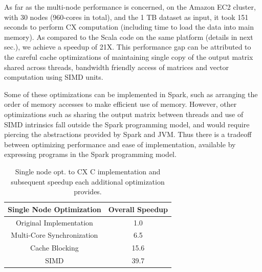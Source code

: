 


        As far as the multi-node performance is concerned, 
 on the Amazon EC2 cluster, with 30 nodes (960-cores in total), and
 the 1 TB dataset as input, it
 took 151 seconds to perform CX computation (including time to load
 the data into main memory). 
 As compared to the Scala code on the same platform (details in
 next sec.), we achieve a speedup of 21X.
%
 This performance gap can be attributed to the careful cache
 optimizations of maintaining single copy of the output matrix shared
 across threads, bandwidth friendly access of matrices and vector
 computation using SIMD units.

 Some of these optimizations can be implemented in Spark, such as arranging the
 order of memory accesses to make efficient use of memory. %
 However, other optimizations such as sharing the output matrix between threads
 and use of SIMD intrinsics fall outside the Spark programming model, and would
 require piercing the abstractions provided by Spark and JVM.
 Thus there is a tradeoff between optimizing performance 
 and ease of implementation, %
 available by expressing programs in the Spark programming model.

 
  \begin{table}
  \begin{center}
  \begin{tabular}{ |c|c| } 
  \hline
  Single Node Optimization & Overall Speedup\\
  \hline
  Original Implementation & 1.0  \\
  Multi-Core Synchronization & 6.5 \\
  Cache Blocking & 15.6 \\
  SIMD & 39.7 \\
  \hline

  \end{tabular}
  \end{center}
  \caption{Single node opt. to CX C implementation and
  subsequent speedup  each additional optimization provides.}
  \label{tab:single_node}
  \end{table}
 



